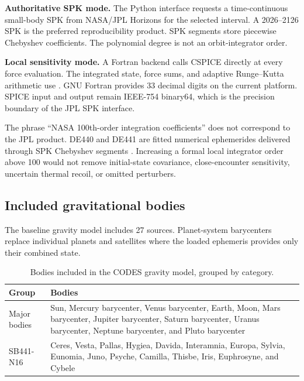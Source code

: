 \begin{resultbox}
\textbf{\color{cGold}Authoritative SPK mode.}
The Python interface requests a time-continuous small-body SPK from NASA/JPL
Horizons for the selected interval. A 2026--2126 SPK is the preferred
reproducibility product. SPK segments store piecewise Chebyshev coefficients.
The polynomial degree is not an orbit-integrator order.
\end{resultbox}

\begin{resultbox}
\textbf{\color{cTeal}Local sensitivity mode.}
A Fortran backend calls CSPICE directly at every force evaluation. The
integrated state, force sums, and adaptive Runge--Kutta arithmetic use
. GNU Fortran provides 33 decimal digits
on the current platform. SPICE input and output remain IEEE-754 binary64,
which is the precision boundary of the JPL SPK interface.
\end{resultbox}

The phrase ``NASA 100th-order integration coefficients'' does not correspond
to the JPL product. DE440 and DE441 are fitted numerical ephemerides delivered
through SPK Chebyshev segments \cite{Park2021}. Increasing a formal local
integrator order above 100 would not remove initial-state covariance,
close-encounter sensitivity, uncertain thermal recoil, or omitted perturbers.

\subsection{Included gravitational bodies}
\label{sec:calculator-bodies}

The baseline gravity model includes 27 sources. Planet-system barycenters
replace individual planets and satellites where the loaded ephemeris provides
only their combined state.

\noindent
\begin{table}
\captionsetup{justification=raggedright, singlelinecheck=false}
\caption{Bodies included in the CODES gravity model, grouped by
category.}
\label{tab:c6-gravity-bodies}
\centering
\begin{tabularx}{\textwidth}{@{}P{43mm}Y@{}}
\toprule
\color{cGold}\textbf{Group} & \color{cGold}\textbf{Bodies}\\
\midrule
Major bodies &
Sun, Mercury barycenter, Venus barycenter, Earth, Moon, Mars barycenter,
Jupiter barycenter, Saturn barycenter, Uranus barycenter, Neptune barycenter,
and Pluto barycenter\\
SB441-N16 &
Ceres, Vesta, Pallas, Hygiea, Davida, Interamnia, Europa, Sylvia, Eunomia,
Juno, Psyche, Camilla, Thisbe, Iris, Euphrosyne, and Cybele\\
\bottomrule
\end{tabularx}
\end{table}

